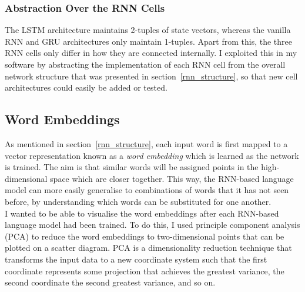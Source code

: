 \documentclass[a4paper, 12pt]{report}
\newcommand{\tit}[1]{\textit{#1}}
\begin{document}
\subsubsection{Abstraction Over the RNN Cells}

The LSTM architecture maintains 2-tuples of state vectors, whereas the vanilla RNN and GRU architectures only maintain 1-tuples. Apart from this, the three RNN cells only differ in how they are connected internally. I exploited this in my software by abstracting the implementation of each RNN cell from the overall network structure that was presented in section~\ref{rnn_structure}, so that new cell architectures could easily be added or tested.

\subsection{Word Embeddings} \label{embeddings}

As mentioned in section~\ref{rnn_structure}, each input word is first mapped to a vector representation known as a \tit{word embedding} which is learned as the network is trained. The aim is that similar words will be assigned points in the high-dimensional space which are closer together. This way, the RNN-based language model can more easily generalise to combinations of words that it has not seen before, by understanding which words can be substituted for one another. \\

I wanted to be able to visualise the word embeddings after each RNN-based language model had been trained. To do this, I used principle component analysis (PCA) to reduce the word embeddings to two-dimensional points that can be plotted on a scatter diagram. PCA is a dimensionality reduction technique that transforms the input data to a new coordinate system such that the first coordinate represents some projection that achieves the greatest variance, the second coordinate the second greatest variance, and so on.
\end{document}
